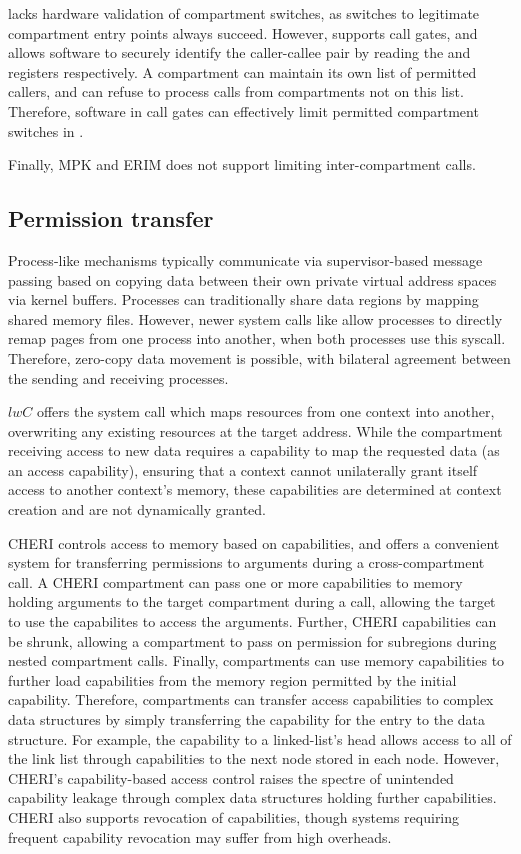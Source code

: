 \seccells lacks hardware validation of compartment switches, as switches
to legitimate compartment entry points always succeed.
However, \seccells supports call gates, and allows software to securely
identify the caller-callee pair by reading the \rid and \sid registers
respectively.
A compartment can maintain its own list of permitted callers, and can
refuse to process calls from compartments not on this list.
Therefore, software in call gates can effectively limit permitted
compartment switches in \seccells.

Finally, MPK and ERIM does not support limiting inter-compartment calls.

\subsection{Permission transfer}
Process-like mechanisms typically communicate via supervisor-based
message passing based on copying data between their own private virtual 
address spaces via kernel buffers.
Processes can traditionally share data regions by mapping shared 
memory files.
However, newer system calls like  allow processes to directly
remap pages from one process into another, when both processes use this
syscall.
Therefore, zero-copy data movement is possible, with bilateral agreement
between the sending and receiving processes.

$lwC$ offers the  system call which maps resources from
one context into another, overwriting any existing resources at the target
address.
While the compartment receiving access to new data requires a capability
to map the requested data (as an access capability), ensuring that a 
context cannot unilaterally grant itself access to another context's
memory, these capabilities are determined at context creation and are
not dynamically granted.

CHERI controls access to memory based on capabilities, and offers a
convenient system for transferring permissions to arguments during a
cross-compartment call.
A CHERI compartment can pass one or more capabilities to memory holding
arguments to the target compartment during a call, allowing the target to
use the capabilites to access the arguments.
Further, CHERI capabilities can be shrunk, allowing a compartment to
pass on permission for subregions during nested compartment calls.
Finally, compartments can use memory capabilities to further load
capabilities from the memory region permitted by the initial capability.
Therefore, compartments can transfer access capabilities to complex 
data structures by simply transferring the capability for the entry
to the data structure.
For example, the capability to a linked-list's head allows access to
all of the link list through capabilities to the next node stored in 
each node.
However, CHERI's capability-based access control raises the spectre of
unintended capability leakage through complex data structures holding 
further capabilities.
CHERI also supports revocation of capabilities, though systems requiring
frequent capability revocation may suffer from high overheads.

